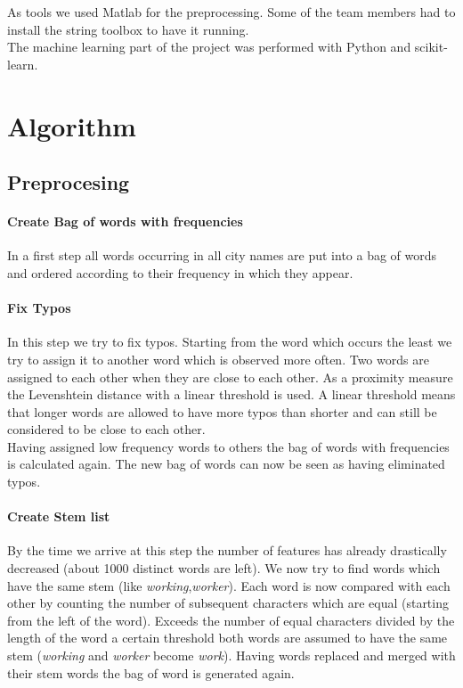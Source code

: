 \documentclass[a4paper, 11pt]{article}
\begin{document}
As tools we used Matlab for the preprocessing. Some of the team members had to install the string toolbox to have it running.\\

The machine learning part of the project was performed with Python and scikit-learn.


\section{Algorithm}


\subsection{Preprocesing}
\label{subsec:preproc}


\paragraph{Create Bag of words with frequencies}

In a first step all words occurring in all city names are put into a bag of words and ordered according to their frequency in which they appear.

\paragraph{Fix Typos}
In this step we try to fix typos. Starting from the word which occurs the least we try to assign it to another word which is observed more often. Two words are assigned to each other when they are close to each other. As a proximity measure the Levenshtein distance with a linear threshold is used. A linear threshold means that longer words are allowed to have more typos than shorter and can still be considered to be close to each other.\\

Having assigned low frequency words to others the bag of words with frequencies is calculated again. The new bag of words can now be seen as having eliminated typos.

\paragraph{Create Stem list}
By the time we arrive at this step the number of features has already drastically decreased (about 1000 distinct words are left). We now try to find words which have the same stem (like \textit{working},\textit{worker}). Each word is now compared with each other by counting the number of subsequent characters which are equal (starting from the left of the word). Exceeds the number of equal characters divided by the length of the word a certain threshold both words are assumed to have the same stem (\textit{working} and \textit{worker} become \textit{work}). Having words replaced and merged with their stem words the bag of word is generated again.
\end{document}
